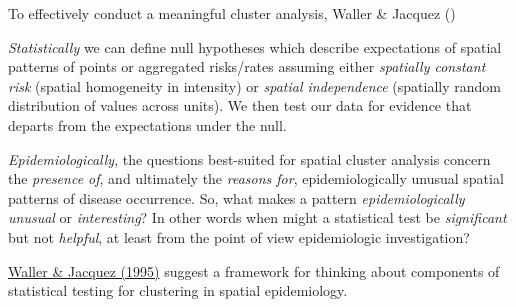 \documentclass[
]{book}
\begin{document}
To effectively conduct a meaningful cluster analysis, Waller \& Jacquez ()

\emph{Statistically} we can define null hypotheses which describe expectations of spatial patterns of points or aggregated risks/rates assuming either \emph{spatially constant risk} (spatial homogeneity in intensity) or \emph{spatial independence} (spatially random distribution of values across units). We then test our data for evidence that departs from the expectations under the null.

\emph{Epidemiologically}, the questions best-suited for spatial cluster analysis concern the \emph{presence of}, and ultimately the \emph{reasons for}, epidemiologically unusual spatial patterns of disease occurrence. So, what makes a pattern \emph{epidemiologically unusual} or \emph{interesting}? In other words when might a statistical test be \emph{significant} but not \emph{helpful}, at least from the point of view epidemiologic investigation?

\href{https://journals.lww.com/epidem/Abstract/1995/11000/Disease_Models_Implicit_in_Statistical_Tests_of.4.aspx}{Waller \& Jacquez (1995)} suggest a framework for thinking about components of statistical testing for clustering in spatial epidemiology.
\end{document}

